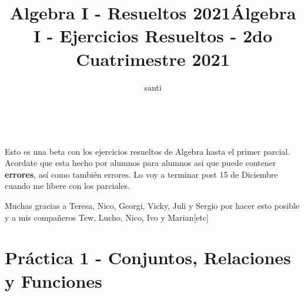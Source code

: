 \documentclass[a4paper,11pt]{article}
\title{Algebra I - Resueltos 2021}
\begin{document}
\makeatletter
\renewcommand{\maketitle}{
\begin{center}
\begin{normalsize}\textbf{\@title}\end{normalsize}\\
\begin{normalsize}\@author\end{normalsize}
\end{center}
}
\title{Álgebra I - Ejercicios Resueltos - 2do Cuatrimestre 2021} 
\author{santi}
\maketitle

Esto es una beta con los ejercicios resueltos de Algebra hasta el primer parcial. Acordate que esta hecho por alumnos para alumnos asi que puede contener \textbf{errores}, así como también errores. Lo voy a terminar post 15 de Diciembre cuando me libere con los parciales. 

Muchas gracias a Teresa, Nico, Georgi, Vicky, Juli y Sergio por hacer esto posible y a mis compañeros Tew, Lucho, Nico, Ivo y Marian[etc]

\section{Práctica 1 - Conjuntos, Relaciones y Funciones}
\end{document}
